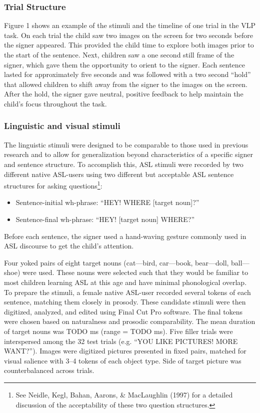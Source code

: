 \documentclass[12pt,]{article}
\let\rmarkdownfootnote\footnote%
\def\footnote{\protect\rmarkdownfootnote}
\begin{document}
\subsubsection{Trial Structure}\label{trial-structure}

Figure 1 shows an example of the stimuli and the timeline of one trial
in the VLP task. On each trial the child saw two images on the screen
for two seconds before the signer appeared. This provided the child time
to explore both images prior to the start of the sentence. Next,
children saw a one second still frame of the signer, which gave them the
opportunity to orient to the signer. Each sentence lasted for
approximately five seconds and was followed with a two second ``hold''
that allowed children to shift away from the signer to the images on the
screen. After the hold, the signer gave neutral, positive feedback to
help maintain the child's focus throughout the task.

\subsubsection{Linguistic and visual
stimuli}\label{linguistic-and-visual-stimuli}

The linguistic stimuli were designed to be comparable to those used in
previous research and to allow for generalization beyond characteristics
of a specific signer and sentence structure. To accomplish this, ASL
stimuli were recorded by two different native ASL-users using two
different but acceptable ASL sentence structures for asking
questions\footnote{See Neidle, Kegl, Bahan, Aarons, \& MacLaughlin
  (1997) for a detailed discussion of the acceptability of these two
  question structures.}:

\begin{itemize}
\itemsep1pt\parskip0pt
\item
  Sentence-initial wh-phrase: ``HEY! WHERE {[}target noun{]}?''
\item
  Sentence-final wh-phrase: ``HEY! {[}target noun{]} WHERE?''
\end{itemize}

Before each sentence, the signer used a hand-waving gesture commonly
used in ASL discourse to get the child's attention.

Four yoked pairs of eight target nouns (cat---bird, car---book,
bear---doll, ball---shoe) were used. These nouns were selected such that
they would be familiar to most children learning ASL at this age and
have minimal phonological overlap. To prepare the stimuli, a female
native ASL-user recorded several tokens of each sentence, matching them
closely in prosody. These candidate stimuli were then digitized,
analyzed, and edited using Final Cut Pro software. The final tokens were
chosen based on naturalness and prosodic comparability. The mean
duration of target nouns was TODO ms (range = TODO ms). Five filler
trials were interspersed among the 32 test trials (e.g. ``YOU LIKE
PICTURES! MORE WANT?''). Images were digitized pictures presented in
fixed pairs, matched for visual salience with 3--4 tokens of each object
type. Side of target picture was counterbalanced across trials.
\end{document}

